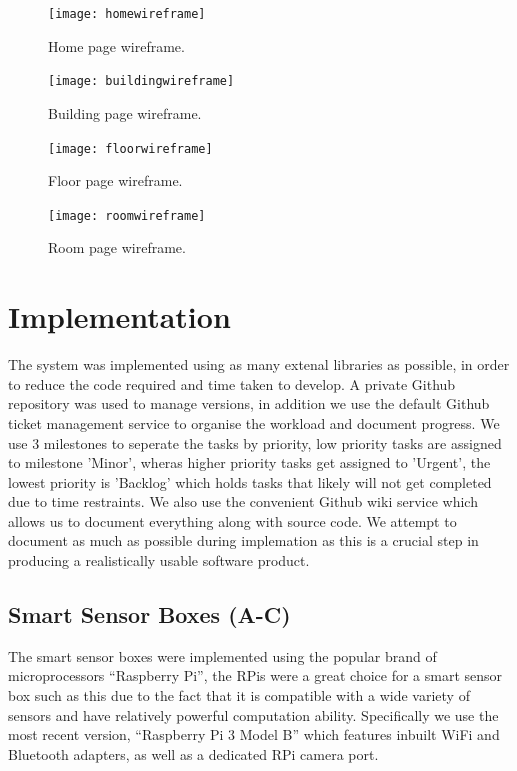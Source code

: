 \documentclass{l4proj}
\begin{document}
\begin{figure}
\centering
\texttt{[image: homewireframe]}
\caption{Home page wireframe.}
\label{fig:homewireframe}
\end{figure}
\begin{figure}
\centering
\texttt{[image: buildingwireframe]}
\caption{Building page wireframe.}
\label{fig:buildingwireframe}
\end{figure}
\begin{figure}
\centering
\texttt{[image: floorwireframe]}
\caption{Floor page wireframe.}
\label{fig:floorwireframe}
\end{figure}
\begin{figure}
\centering
\texttt{[image: roomwireframe]}
\caption{Room page wireframe.}
\label{fig:roomwireframe}
\end{figure}















\chapter{Implementation}
The system was implemented using as many extenal libraries as possible, in order to reduce the code required and time taken to develop. A private Github repository was used to manage versions, in addition we use the default Github ticket management service to organise the workload and document progress. We use 3 milestones to seperate the tasks by priority, low priority tasks are assigned to milestone 'Minor', wheras higher priority tasks get assigned to 'Urgent', the lowest priority is 'Backlog' which holds tasks that likely will not get completed due to time restraints. We also use the convenient Github wiki service which allows us to document  everything along with source code. We attempt to document as much as possible during implemation as this is a crucial step in producing a realistically usable software product\cite{c-github}.

\section{Smart Sensor Boxes (A-C)}
The smart sensor boxes were implemented using the popular brand of microprocessors “Raspberry Pi”, the RPis were a great choice for a smart sensor box such as this due to the fact that it is compatible with a wide variety of sensors and have relatively powerful computation ability. Specifically we use the most recent version, “Raspberry Pi 3 Model B” which features inbuilt WiFi and Bluetooth adapters, as well as a dedicated RPi camera port\cite{c-rpi3b}. 
\end{document}
